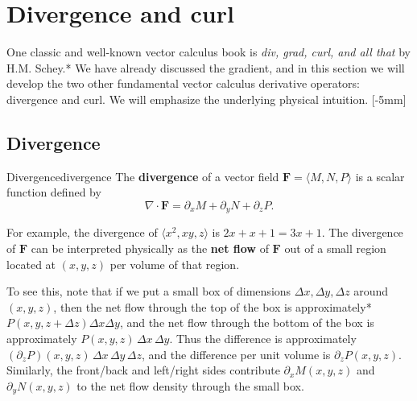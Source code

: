 \documentclass{watsonbook}
\begin{document}
\section{Divergence and curl} \label{sec:divcurl} 

One classic and well-known vector calculus book is \textit{div, grad,
  curl, and all that} by H.M. Schey.* We have already discussed the
gradient, and in this section we will develop the two other
fundamental vector calculus derivative operators: divergence and
curl. We will emphasize the underlying physical intuition. [-5mm]

\subsection{Divergence}


\begin{defn}{Divergence}{divergence}
  The \textbf{divergence} of a vector field
  $\mathbf{F} = \langle M, N, P \rangle$ is a scalar function defined
  by
  \[
    \nabla \cdot \mathbf{F} = \partial_x M  +\partial _y N + \partial_z
    P. 
  \]
\end{defn}

For example, the divergence of $\langle x^2, xy, z \rangle$ is
$2x + x + 1 = 3x + 1$. The divergence of $\mathbf{F}$ can be
interpreted physically as the \textbf{net flow} of $\mathbf{F}$ out of
a small region located at $(x,y,z)$ per volume of that region. 

To see this, note that if we put a small box of dimensions $\Delta x, \Delta y, \Delta z$
around $(x,y,z)$, then the net flow through the top of the box is
approximately* $P(x,y,z+\Delta z)\Delta x \Delta y$, and the net flow
through the bottom of the box is approximately
$P(x, y, z)\, \Delta x \,\Delta y$. Thus the difference is approximately
$(\partial_z P)(x,y,z) \, \Delta x \,  \Delta y \, \Delta z$, and the
difference per unit volume is $\partial_z P(x,y,z)$. Similarly, the front/back
and left/right sides contribute $\partial_x M(x,y,z)$ and $\partial_y N(x,y,z)$ to
the net flow density through the small box.
\end{document}

